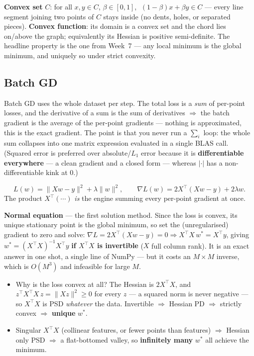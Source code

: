 \documentclass[11pt, a4paper]{article}
\newcommand{\kw}[1]{\textbf{#1}}
\begin{document}
\begin{defbox}
\kw{Convex set} $C$: for all $x,y\in C$, $\beta\in[0,1]$, $\;(1-\beta)x+\beta y\in C$ — every line
segment joining two points of $C$ stays inside (no dents, holes, or separated pieces).
\kw{Convex function}: its domain is a convex set and the chord lies on/above the graph; equivalently
its Hessian is positive semi-definite. The headline property is the one from Week~7 — any local
minimum is the global minimum, and uniquely so under strict convexity.
\end{defbox}

\subsection{Batch GD}

Batch GD uses the whole dataset per step. The total loss is a \emph{sum} of per-point losses, and
the derivative of a sum is the sum of derivatives $\Rightarrow$ the batch gradient is the average of
the per-point gradients — nothing is approximated, this is the exact gradient. The point is that you
never run a $\sum_i$ loop: the whole sum collapses into one matrix expression evaluated in a single
BLAS call. (Squared error is preferred over absolute/$L_1$ error because it is \kw{differentiable
everywhere} — a clean gradient and a closed form — whereas $|\cdot|$ has a non-differentiable kink at
$0$.)
\begin{setupbox}
\[
L(w)=\|Xw-y\|^2+\lambda\|w\|^2, \qquad
\nabla L(w)=2X^\top(Xw-y)+2\lambda w.
\]
The product $X^\top(\cdots)$ \emph{is} the engine summing every per-point gradient at once.
\end{setupbox}

\kw{Normal equation} — the first solution method. Since the loss is convex, its unique stationary
point is the global minimum, so set the (unregularised) gradient to zero and solve:
$\nabla L=2X^\top(Xw-y)=0\Rightarrow X^\top X\,w^\ast=X^\top y$, giving
$w^\ast=(X^\top X)^{-1}X^\top y$ \kw{if $X^\top X$ is invertible} ($X$ full column rank). It is an
exact answer in one shot, a single line of NumPy — but it costs an $M\times M$ inverse, which is
$O(M^3)$ and infeasible for large $M$.
\begin{itemize}
  \item Why is the loss convex at all? The Hessian is $2X^\top X$, and
  $z^\top X^\top X\,z=\|Xz\|^2\ge0$ for every $z$ — a squared norm is never negative — so $X^\top X$
  is PSD \emph{whatever} the data. Invertible $\Rightarrow$ Hessian PD $\Rightarrow$ strictly convex
  $\Rightarrow$ \kw{unique} $w^\ast$.
  \item Singular $X^\top X$ (collinear features, or fewer points than features) $\Rightarrow$ Hessian
  only PSD $\Rightarrow$ a flat-bottomed valley, so \kw{infinitely many} $w^\ast$ all achieve the
  minimum.
\end{itemize}
\end{document}
